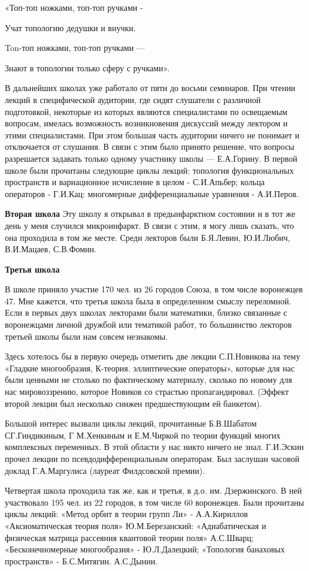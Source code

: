 «Топ-топ ножками, топ-топ ручками -

Учат топологию дедушки и внучки.

Ton-топ ножками, топ-топ ручками —

Знают в топологии только сферу с ручками».

В дальнейших школах уже работало от пяти до восьми семинаров. При чтении лекций в специфической аудитории, где сидят слушатели с различной подготовкой, некоторые из которых являются специалистами по освещаемым вопросам, имелась возможность возникновения дискуссий между лектором и этими специалистами. При этом большая часть аудитории ничего не понимает и отключается от слушания. В связи с этим было принято решение, что вопросы разрешается задавать только одному участнику школы — Е.А.Горину.
В первой школе были прочитаны следующие циклы лекций: топология функциональных пространств и вариационное исчисление в целом - С.И.Апьбер; кольца операторов - Г.И.Кац: многомерные дифференциальные уравнения - А.И.Перов.

{\bf Вторая школа}
Эту школу я открывал в предынфарктном состоянии и в тот же день у меня случился микроинфаркт. В связи с этим, я могу лишь сказать, что она проходила в том же месте. Среди лекторов были Б.Я.Левин, Ю.И.Любич, В.И.Мацаев, С.В.Фомин.

{\bf Третья школа}

В школе приняло участие 170 чел. из 26 городов Союза, в том числе воронежцев 47. Мне кажется, что третья школа была в определенном смыслу переломной. Если в первых двух школах лекторами были математики, близко связанные с воронежцами личной дружбой или тематикой работ, то большинство лекторов третьей школы были нам совсем незнакомы.

Здесь хотелось бы в первую очередь отметить две лекции С.П.Новикова на тему «Гладкие многообразия, К-теория. эллиптические операторы», которые для нас были ценными не столько по фактическому материалу, сколько по новому для нас мировоззрению, которое Новиков со страстью пропагандировал. (Эффект второй лекции был несколько снижен предшествующим ей банкетом).

Большой интерес вызвали циклы лекций, прочитанные Б.В.Шабатом СГ.Гиндикиным, Г М.Хенкиным и Е.М.Чиркой по теории функций многих комплексных переменных. В этой области у нас никто ничего не знал. Г.И.Эскин прочел лекции по псевдодифференциальным операторам. Был заслушан часовой доклад Г.А.Маргулиса (лауреат Филдсовской премии).

Четвертая школа проходила так же, как и третья, в д.о. им. Дзержинского. В ней участвовало 195 чел. из 22 городов, в том числе 60 воронежцев. Были прочитаны циклы лекций: «Метод орбит в теории групп Ли» - А.А.Кириллов «Аксиоматическая теория поля» Ю.М.Березанский: «Адиабатическая и физическая матрица рассеяния квантовой теории поля» А.С.Шварц; «Бесконечномерные многообразия» - Ю.Л.Далецкий; «Топология банаховых пространств» - Б.С.Митягин. А.С.Дынии.

